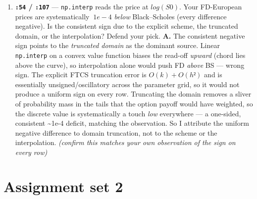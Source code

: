 \documentclass[
  11pt,
]{article}
\begin{document}
\begin{enumerate}
  holds? \textbf{A.} \texttt{h\ =\ L/Nx} with \(L = 2ln40+2 ≈ 9.378\),
  so \texttt{h\ ≈\ 9.378/1000\ ≈\ 9.38e-3}, \(h² ≈ 8.79e-5\).
  \texttt{k\ =\ T/Nt\ =\ T/(40000T)\ =\ 1/40000\ =\ 2.5e-5}. Then
  \texttt{½σ²k/h²\ =\ ½·0.16·2.5e-5/8.79e-5\ ≈\ 0.5·0.16·0.2845\ ≈\ 0.0228},
  well under \(½\). So the explicit FTCS scheme is stable (von Neumann
  diffusion bound satisfied with large margin). \(Nt\) is huge mostly to
  satisfy this \texttt{k\ ≤\ h²/σ²} stability constraint --- explicit
  schemes force \(k = O(h²)\), so refining \(Nx\) (smaller \(h\))
  demands quadratically more time steps; accuracy is a secondary
  beneficiary. The \(T1\) advection (central difference) can produce
  spurious oscillations when the \emph{cell Péclet number}
  \texttt{\textbar{}r−½σ²\textbar{}h/σ²} exceeds \textasciitilde1,
  independently of the diffusion bound; here drift is small and \(h\)
  tiny so Péclet \textless\textless{} 1, no oscillation, but in
  principle yes it can. \emph{(confirm the numbers against your
  printout)}
\item
  \textbf{\texttt{:54} / \texttt{:107}} --- \texttt{np.interp} reads the
  price at \(log(S0)\). Your FD-European prices are systematically
  \(~1e-4\) \emph{below} Black--Scholes (every difference negative). Is
  the consistent sign due to the explicit scheme, the truncated domain,
  or the interpolation? Defend your pick. \textbf{A.} The consistent
  negative sign points to the \emph{truncated domain} as the dominant
  source. Linear \texttt{np.interp} on a convex value function biases
  the read-off \emph{upward} (chord lies above the curve), so
  interpolation alone would push FD \emph{above} BS --- wrong sign. The
  explicit FTCS truncation error is \(O(k)+O(h²)\) and is essentially
  unsigned/oscillatory across the parameter grid, so it would not
  produce a uniform sign on every row. Truncating the domain removes a
  sliver of probability mass in the tails that the option payoff would
  have weighted, so the discrete value is systematically a touch
  \emph{low} everywhere --- a one-sided, consistent \textasciitilde1e-4
  deficit, matching the observation. So I attribute the uniform negative
  difference to domain truncation, not to the scheme or the
  interpolation. \emph{(confirm this matches your own observation of the
  sign on every row)}
\end{enumerate}

\hypertarget{assignment-set-2}{%
\section{Assignment set 2}\label{assignment-set-2}}
\end{document}
